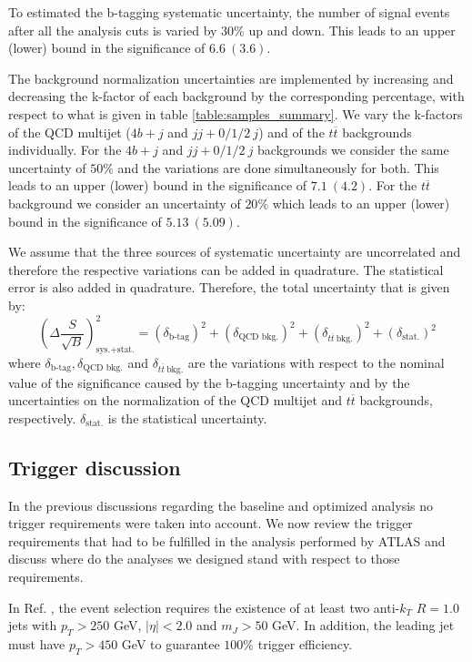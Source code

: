 To estimated the b-tagging systematic uncertainty, the number of signal events after all the analysis cuts is varied by $30\%$ up and down. This leads to an upper (lower) bound in the significance of $6.6~(3.6)$.

The background normalization uncertainties are implemented by increasing and decreasing the k-factor of each background by the corresponding percentage, with respect to what is given in table \ref{table:samples_summary}. We vary the k-factors of the QCD multijet ($4b+j$ and $jj+0/1/2 ~j$) and of the $t\overline{t}$ backgrounds individually. For the $4b+j$ and $jj+0/1/2 ~j$ backgrounds we consider the same uncertainty of $50\%$ and the variations are done simultaneously for both. This leads to an upper (lower) bound in the significance of $7.1~(4.2)$. For the $t\overline{t}$ background we consider an uncertainty of $20\%$ which leads to an upper (lower) bound in the significance of $5.13~(5.09)$.

We assume that the three sources of systematic uncertainty are uncorrelated and therefore the respective variations can be added in quadrature. The statistical error is also added in quadrature. Therefore, the total uncertainty that is given by:
\begin{equation}
	\left(\Delta\frac{S}{\sqrt{B}}\right)_{\text{sys.+stat.}}^2=\left(\delta_{\text{b-tag}}\right)^2+\left(\delta_{\text{QCD bkg.}}\right)^2+\left(\delta_{t\overline{t}~\text{bkg.}}\right)^2+\left(\delta_{\text{stat.}}\right)^2
\end{equation}
where $\delta_{\text{b-tag}},\delta_{\text{QCD bkg.}}$ and $\delta_{t\overline{t}~\text{bkg.}}$ are the variations with respect to the nominal value of the significance caused by the b-tagging uncertainty and by the uncertainties on the normalization of the  QCD multijet and $t\overline{t}$ backgrounds, respectively. $\delta_{\text{stat.}}$ is the statistical uncertainty. 

\subsection{Trigger discussion}

In the previous discussions regarding the baseline and optimized analysis no trigger requirements were taken into account. We now review the trigger requirements that had to be fulfilled in the analysis performed by ATLAS and discuss where do the analyses we designed stand with respect to those requirements. 

In Ref. \cite{hh2bbbbATLAS1}, the event selection requires the existence of at least two anti-$k_T$ $R=1.0$ jets with $p_T>250$ GeV, $|\eta|<2.0$ and $m_J>50$ GeV. In addition, the leading jet must have $p_T>450$ GeV to guarantee $100\%$ trigger efficiency. 

